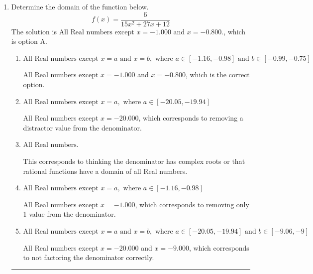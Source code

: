 \documentclass{extbook}[14pt]
\newcommand{\litem}[1]{\item #1

\rule{\textwidth}{0.4pt}}
\begin{document}
\begin{enumerate}\litem{
Determine the domain of the function below.
\[ f(x) = \frac{6}{15x^{2} +27 x + 12} \]The solution is \( \text{All Real numbers except } x = -1.000 \text{ and } x = -0.800. \), which is option A.\begin{enumerate}[label=\Alph*.]
\item \( \text{All Real numbers except } x = a \text{ and } x = b, \text{ where } a \in [-1.16, -0.98] \text{ and } b \in [-0.99, -0.75] \)

All Real numbers except $x = -1.000$ and $x = -0.800$, which is the correct option.
\item \( \text{All Real numbers except } x = a, \text{ where } a \in [-20.05, -19.94] \)

All Real numbers except $x = -20.000$, which corresponds to removing a distractor value from the denominator.
\item \( \text{All Real numbers.} \)

This corresponds to thinking the denominator has complex roots or that rational functions have a domain of all Real numbers.
\item \( \text{All Real numbers except } x = a, \text{ where } a \in [-1.16, -0.98] \)

All Real numbers except $x = -1.000$, which corresponds to removing only 1 value from the denominator.
\item \( \text{All Real numbers except } x = a \text{ and } x = b, \text{ where } a \in [-20.05, -19.94] \text{ and } b \in [-9.06, -9] \)

All Real numbers except $x = -20.000$ and $x = -9.000$, which corresponds to not factoring the denominator correctly.
\end{enumerate}

}
\end{enumerate}
\end{document}
